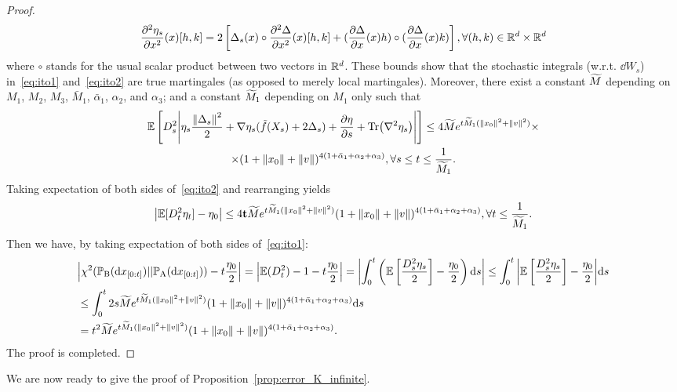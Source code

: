 \documentclass{article}
\theoremstyle{plain}
\theoremstyle{definition}
\theoremstyle{remark}
\begin{document}
\begin{proof}
	\begin{equation*}
		\frac{\partial^2\eta_s}{\partial x^2}(x)[h, k] = 2\left[ \Delta_s(x)\circ \frac{\partial^2\Delta}{\partial x^2}(x)[h,k] + (\frac{\partial\Delta}{\partial x}(x)h) \circ (\frac{\partial\Delta}{\partial x}(x)k) \right], \forall (h, k) \in \mathbb R^d \times \mathbb R^d
	\end{equation*}
	where $\circ$ stands for the usual scalar product between two vectors in $\mathbb{R}^d$.
	These bounds show that the stochastic integrals (w.r.t. $\dd W_s$) in~\eqref{eq:ito1} and~\eqref{eq:ito2} are true martingales (as opposed to merely local martingales). Moreover, there exist a constant $\widetilde M$ depending on $M_1$, $M_2$, $M_3$, $\bar M_1$, $\bar \alpha_1$, $\alpha_2$, and $\alpha_3$; and a constant $\widetilde M_1$ depending on $M_1$ only such that
	\newcommand{\ssnxonv}{\norm{x_0}^2 + \norm{v}^2}
	\newcommand{\vtailterm}{(1+\norm{x_0} + \norm{v})^{4(1+\bar\alpha_1+\alpha_2+\alpha_3)}}
	\begin{multline*}
		\E\ps{D_s^2 \abs{\eta_s \frac{\norm{\Delta_s}^2}{2} + \nabla \eta_s(\tilde f(X_s) + 2 \Delta_s) + \frac{\partial \eta}{\partial s} + \Tr(\nabla^2 \eta_s)}} \leq 4\wtm e^{t\wtm_1(\ssnxonv)} \times \\ \times \vtailterm, \forall s\leq t\leq \frac{1}{\wtm_1}.
	\end{multline*}
	Taking expectation of both sides of~\eqref{eq:ito2} and rearranging yields
	\begin{equation*}
		\abs{\E[D_t^2 \eta_t] - \eta_0} \leq 4\mathbf{t}\wtm e^{t\wtm_1(\ssnxonv)}  \vtailterm, \forall t\leq \frac{1}{\wtm_1}.
	\end{equation*}
	Then we have, by taking expectation of both sides of~\eqref{eq:ito1}:
	\begin{equation*}
		\begin{split}
			&\abs{\chisquared{\xbzt}{\xazt} - t\frac{\eta_0}{2}} = \abs{\E(D_t^2) - 1 - t\frac{\eta_0}{2}} = \abs{\int_0^t \pr{\E\ps{\frac{D_s^2 \eta_s}{2}} - \frac{\eta_0}{2}} \dd s} \leq \int_0^t \abs{\E\ps{\frac{D_s^2\eta_s}{2}} - \frac{\eta_0}{2}} \dd s \\
			&\leq \int_0^t 2s\wtm e^{t\wtm_1(\ssnxonv)} \vtailterm \dd s \\
			&= t^2 \wtm e^{t\wtm_1(\ssnxonv)} \vtailterm.
		\end{split}
	\end{equation*}
	The proof is completed.
\end{proof}
We are now ready to give the proof of Proposition~\ref{prop:error_K_infinite}.
\end{document}
